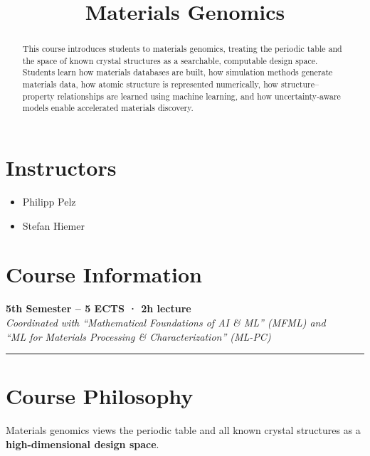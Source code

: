 \documentclass[
]{agujournal2019}
\providecommand{\tightlist}{%
  \setlength{\itemsep}{0pt}\setlength{\parskip}{0pt}}
\begin{document}
\title{Materials Genomics}




\begin{abstract}
This course introduces students to materials genomics, treating the
periodic table and the space of known crystal structures as a
searchable, computable design space. Students learn how materials
databases are built, how simulation methods generate materials data, how
atomic structure is represented numerically, how structure--property
relationships are learned using machine learning, and how
uncertainty-aware models enable accelerated materials discovery.
\end{abstract}





\section{Instructors}\label{instructors}

\begin{itemize}
\tightlist
\item
  Philipp Pelz
\item
  Stefan Hiemer
\end{itemize}

\section{Course Information}\label{course-information}

\textbf{5th Semester -- 5 ECTS · 2h lecture}\\
\emph{Coordinated with ``Mathematical Foundations of AI \& ML'' (MFML)
and\\
``ML for Materials Processing \& Characterization'' (ML-PC)}

\begin{center}\rule{0.5\linewidth}{0.5pt}\end{center}

\section{Course Philosophy}\label{course-philosophy}

Materials genomics views the periodic table and all known crystal
structures as a \textbf{high-dimensional design space}.
\end{document}

